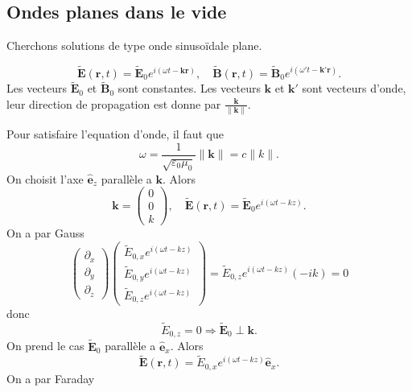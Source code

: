 \subsection{Ondes planes dans le vide}

Cherchons solutions de type onde sinusoïdale plane.
\begin{notation}
$$\boldsymbol{\tilde{E}}(\boldsymbol{r},t)=\boldsymbol{\tilde{E}}_{0}e^{i(\omega t-\boldsymbol{kr})}, \quad \boldsymbol{\tilde{B}}(\boldsymbol{r},t)=\boldsymbol{\tilde{B}}_{0}e^{ i(\omega't-\boldsymbol{k}'\boldsymbol{r}) }.$$
Les vecteurs $\boldsymbol{\tilde{E}}_{0}$ et $\boldsymbol{\tilde{B}}_{0}$ sont constantes. Les vecteurs $\boldsymbol{k}$ et $\boldsymbol{k}'$ sont vecteurs d'onde, leur direction de propagation est donne par $\frac{\boldsymbol{k}}{\lVert \boldsymbol{k} \rVert}$. 
\end{notation}
Pour satisfaire l'equation d'onde, il faut que 
$$
\omega=\frac{1}{\sqrt{ \varepsilon_{0}\mu_{0} }}\lVert \boldsymbol{k} \rVert =c\lVert k \rVert .
$$
On choisit l'axe $\boldsymbol{\hat{e}}_{z}$ parallèle a $\boldsymbol{k}$. Alors 
$$
\boldsymbol{k}=\begin{pmatrix}
0 \\
0 \\
k
\end{pmatrix}, \quad \boldsymbol{\tilde{E}}(\boldsymbol{r},t)=\boldsymbol{\tilde{E}}_{0}e^{ i(\omega t-kz) }.
$$
On a par Gauss
$$
\begin{pmatrix}
\partial _{x} \\
\partial _{y} \\
\partial _{z}
\end{pmatrix}\begin{pmatrix}
\tilde{E}_{0,x}e^{ i(\omega t-kz) } \\
\tilde{E}_{0,y}e^{ i(\omega t-kz ) } \\
\tilde{E}_{0,z}e^{ i(\omega t-kz) }
\end{pmatrix}=\tilde{E}_{0,z}e^{ i(\omega t-kz) }(-ik)=0
$$
donc
$$
\tilde{E}_{0,z}=0\Rightarrow \boldsymbol{\tilde{E}}_{0}\perp \boldsymbol{k}.
$$
On prend le cas $\boldsymbol{\tilde{E}}_{0}$ parallèle a $\boldsymbol{\hat{e}}_{x}$. Alors
$$
\boldsymbol{\tilde{E}}(\boldsymbol{r},t)=\tilde{E}_{0,x}e^{ i(\omega t-kz) }\boldsymbol{\hat{e}}_{x}.
$$
On a par Faraday

